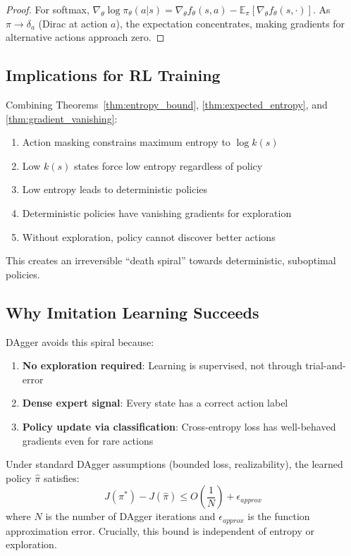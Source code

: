 \begin{proof}
For softmax, $\nabla_\theta \log \pi_\theta(a|s) = \nabla_\theta f_\theta(s,a) - \mathbb{E}_{\pi}[\nabla_\theta f_\theta(s,\cdot)]$. As $\pi \to \delta_a$ (Dirac at action $a$), the expectation concentrates, making gradients for alternative actions approach zero.
\end{proof}

\subsection{Implications for RL Training}

\begin{corollary}
Combining Theorems~\ref{thm:entropy_bound}, \ref{thm:expected_entropy}, and \ref{thm:gradient_vanishing}:
\begin{enumerate}
    \item Action masking constrains maximum entropy to $\log k(s)$
    \item Low $k(s)$ states force low entropy regardless of policy
    \item Low entropy leads to deterministic policies
    \item Deterministic policies have vanishing gradients for exploration
    \item Without exploration, policy cannot discover better actions
\end{enumerate}
This creates an irreversible ``death spiral'' towards deterministic, suboptimal policies.
\end{corollary}

\subsection{Why Imitation Learning Succeeds}

DAgger avoids this spiral because:
\begin{enumerate}
    \item \textbf{No exploration required}: Learning is supervised, not through trial-and-error
    \item \textbf{Dense expert signal}: Every state has a correct action label
    \item \textbf{Policy update via classification}: Cross-entropy loss has well-behaved gradients even for rare actions
\end{enumerate}

\begin{theorem}
Under standard DAgger assumptions (bounded loss, realizability), the learned policy $\hat{\pi}$ satisfies:
\begin{equation}
J(\pi^*) - J(\hat{\pi}) \leq O\left(\frac{1}{N}\right) + \epsilon_{approx}
\end{equation}
where $N$ is the number of DAgger iterations and $\epsilon_{approx}$ is the function approximation error. Crucially, this bound is independent of entropy or exploration.
\end{theorem}

